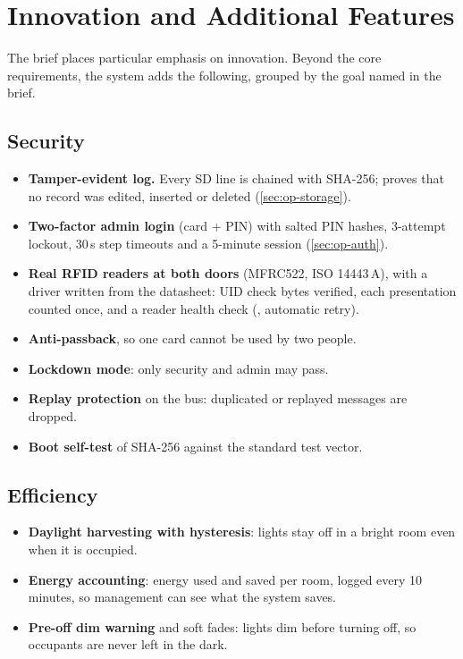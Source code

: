 \section{Innovation and Additional Features}
\label{sec:innovation}

The brief places particular emphasis on innovation. Beyond the core requirements, the system adds
the following, grouped by the goal named in the brief.

\subsection{Security}
\begin{itemize}
  \item \textbf{Tamper-evident log.} Every SD line is chained with SHA-256; 
        proves that no record was edited, inserted or deleted (\cref{sec:op-storage}).
  \item \textbf{Two-factor admin login} (card + PIN) with salted PIN hashes, 3-attempt lockout,
        30\,s step timeouts and a 5-minute session (\cref{sec:op-auth}).
  \item \textbf{Real RFID readers at both doors} (MFRC522, ISO 14443\,A), with a driver written
        from the datasheet: UID check bytes verified, each presentation counted once, and a reader
        health check (, automatic retry).
  \item \textbf{Anti-passback}, so one card cannot be used by two people.
  \item \textbf{Lockdown mode}: only security and admin may pass.
  \item \textbf{Replay protection} on the bus: duplicated or replayed messages are dropped.
  \item \textbf{Boot self-test} of SHA-256 against the standard test vector.
\end{itemize}

\subsection{Efficiency}
\begin{itemize}
  \item \textbf{Daylight harvesting with hysteresis}: lights stay off in a bright room even when it
        is occupied.
  \item \textbf{Energy accounting}: energy used and saved per room, logged every 10 minutes, so
        management can see what the system saves.
  \item \textbf{Pre-off dim warning} and soft fades: lights dim before turning off, so occupants
        are never left in the dark.
\end{itemize}

